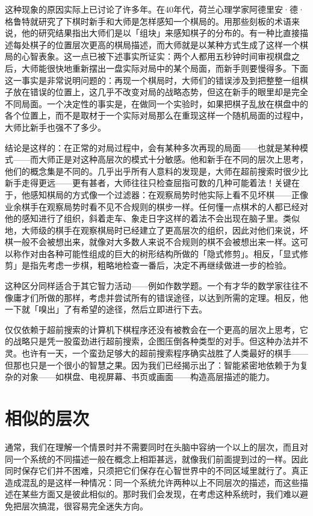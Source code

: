 \documentclass[
  12pt,
  twoside,
  openright,
  oldfontcommands,
]{memoir}
\begin{document}
这种现象的原因实际上已讨论了许多年。在40年代，荷兰心理学家阿德里安·德·格鲁特就研究了下棋时新手和大师是怎样感知一个棋局的。用那些刻板的术语来说，他的研究结果指出大师们是以「组块」来感知棋子的分布的。有一种比直接描述每处棋子的位置层次更高的棋局描述，而大师就是以某种方式生成了这样一个棋局的心智表象。这一点已被下述事实所证实：两个人都用五秒钟时间审视棋盘之后，大师能很快地重新摆出一盘实际对局中的某个局面，而新手则要慢得多。下面这一事实是非常说明问题的：再现一个棋局时，大师们的错误涉及到把整整一组棋子放在错误的位置上，这几乎不改变对局的战略态势，但这在新手的眼里却是完全不同局面。一个决定性的事实是，在做同一个实验时，如果把棋子乱放在棋盘中的各个位置上，而不是取材于一个实际对局那么在重现这样一个随机局面的过程中，大师比新手也强不了多少。

结论是这样的：在正常的对局过程中，会有某种多次再现的局面------也就是某种模式------而大师正是对这种高层次的模式十分敏感。他和新手在不同的层次上思考，他们的概念集是不同的。几乎出乎所有人意料的发现是，大师在超前搜索时很少比新手走得更远------更有甚者，大师往往只检查屈指可数的几种可能着法！关键在于，他感知棋局的方式像一个过滤器：在观察局势时他实际上看不见坏棋------正像业余棋手在观察局势时看不见不合规则的棋步一样。任何懂一点棋术的人都已经对他的感知进行了组织，斜着走车、象走日字这样的着法不会出现在脑子里。类似地，大师级的棋手在观察棋局时已经建立了更高层次的组织，因此对他们来说，坏棋一般不会被想出来，就像对大多数人来说不合规则的棋不会被想出来一样。这可以称作对由各种可能性组成的巨大的树形结构所做的「隐式修剪」。相反，「显式修剪」是指先考虑一步棋，粗略地检查一番后，决定不再继续做进一步的检验。

这种区分同样适合于其它智力活动------例如作数学题。一个有才华的数学家往往不像庸才们所做的那样，考虑并尝试所有的错误途径，以达到所需的定理。相反，他一下就「嗅出」了有希望的途径，然后立即进行下去。

仅仅依赖于超前搜索的计算机下棋程序还没有被教会在一个更高的层次上思考，它的战略只是凭一股蛮劲进行超前搜索，企图压倒各种类型的对手。但这种办法并不灵。也许有一天，一个蛮劲足够大的超前搜索程序确实战胜了人类最好的棋手------但那也只是一个很小的智慧之果。因为我们已经揭示出了：智能紧密地依赖于为复杂的对象------如棋盘、电视屏幕、书页或画面------构造高层描述的能力。

\section{相似的层次}

通常，我们在理解一个情景时并不需要同时在头脑中容纳一个以上的层次，而且对同一个系统的不同描述一般在概念上相距甚远，就像我们前面提到过的一样。因此同时保存它们并不困难，只须把它们保存在心智世界中的不同区域里就行了。真正造成混乱的是这样一种情况：同一个系统允许两种以上不同层次的描述，而这些描述在某些方面又是彼此相似的。那时我们会发现，在考虑这种系统时，我们难以避免把层次搞混，很容易完全迷失方向。
\end{document}
